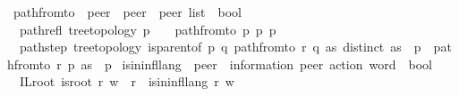 \begin{isabellebody}
\isanewline
{}\isamarkupfalse%
\ path{\isacharunderscore}{\kern0pt}from{\isacharunderscore}{\kern0pt}to\ {\isacharcolon}{\kern0pt}{\isacharcolon}{\kern0pt}\ {\isachardoublequoteopen}{\isacharprime}{\kern0pt}peer\ {\isasymRightarrow}\ {\isacharprime}{\kern0pt}peer\ {\isasymRightarrow}\ {\isacharprime}{\kern0pt}peer\ list\ {\isasymRightarrow}\ bool{\isachardoublequoteclose}\ \isanewline
\ \ path{\isacharunderscore}{\kern0pt}refl{\isacharcolon}{\kern0pt}\ {\isachardoublequoteopen}{\isasymlbrakk}tree{\isacharunderscore}{\kern0pt}topology{\isacharsemicolon}{\kern0pt}\ p\ {\isasymin}\ {\isasymP}{\isasymrbrakk}\ {\isasymLongrightarrow}\ path{\isacharunderscore}{\kern0pt}from{\isacharunderscore}{\kern0pt}to\ p\ p\ {\isacharbrackleft}{\kern0pt}p{\isacharbrackright}{\kern0pt}{\isachardoublequoteclose}\ {\isacharbar}{\kern0pt}\isanewline
\ \ path{\isacharunderscore}{\kern0pt}step{\isacharcolon}{\kern0pt}\ {\isachardoublequoteopen}{\isasymlbrakk}tree{\isacharunderscore}{\kern0pt}topology{\isacharsemicolon}{\kern0pt}\ is{\isacharunderscore}{\kern0pt}parent{\isacharunderscore}{\kern0pt}of\ p\ q{\isacharsemicolon}{\kern0pt}\ path{\isacharunderscore}{\kern0pt}from{\isacharunderscore}{\kern0pt}to\ r\ q\ as{\isacharsemicolon}{\kern0pt}\ distinct\ {\isacharparenleft}{\kern0pt}as\ {\isacharat}{\kern0pt}\ {\isacharbrackleft}{\kern0pt}p{\isacharbrackright}{\kern0pt}{\isacharparenright}{\kern0pt}{\isasymrbrakk}\ {\isasymLongrightarrow}\ path{\isacharunderscore}{\kern0pt}from{\isacharunderscore}{\kern0pt}to\ r\ p\ {\isacharparenleft}{\kern0pt}as\ {\isacharat}{\kern0pt}\ {\isacharbrackleft}{\kern0pt}p{\isacharbrackright}{\kern0pt}{\isacharparenright}{\kern0pt}{\isachardoublequoteclose}%
\isadelimdocument
%
\endisadelimdocument
%
\isatagdocument
%
\isamarkuptrue%
%
\endisatagdocument
{\isafolddocument}%
%
\isadelimdocument
%
\endisadelimdocument
{}\isamarkupfalse%
\ is{\isacharunderscore}{\kern0pt}in{\isacharunderscore}{\kern0pt}infl{\isacharunderscore}{\kern0pt}lang\ {\isacharcolon}{\kern0pt}{\isacharcolon}{\kern0pt}\ {\isachardoublequoteopen}{\isacharprime}{\kern0pt}peer\ {\isasymRightarrow}\ {\isacharparenleft}{\kern0pt}{\isacharprime}{\kern0pt}information{\isacharcomma}{\kern0pt}\ {\isacharprime}{\kern0pt}peer{\isacharparenright}{\kern0pt}\ action\ word\ {\isasymRightarrow}\ bool{\isachardoublequoteclose}\ \isanewline
\ \ IL{\isacharunderscore}{\kern0pt}root{\isacharcolon}{\kern0pt}\ {\isachardoublequoteopen}{\isasymlbrakk}is{\isacharunderscore}{\kern0pt}root\ r{\isacharsemicolon}{\kern0pt}\ w\ {\isasymin}\ {\isasymL}{\isacharparenleft}{\kern0pt}r{\isacharparenright}{\kern0pt}{\isasymrbrakk}\ {\isasymLongrightarrow}\ is{\isacharunderscore}{\kern0pt}in{\isacharunderscore}{\kern0pt}infl{\isacharunderscore}{\kern0pt}lang\ r\ w{\isachardoublequoteclose}\ {\isacharbar}{\kern0pt}\ %

\end{isabellebody}
